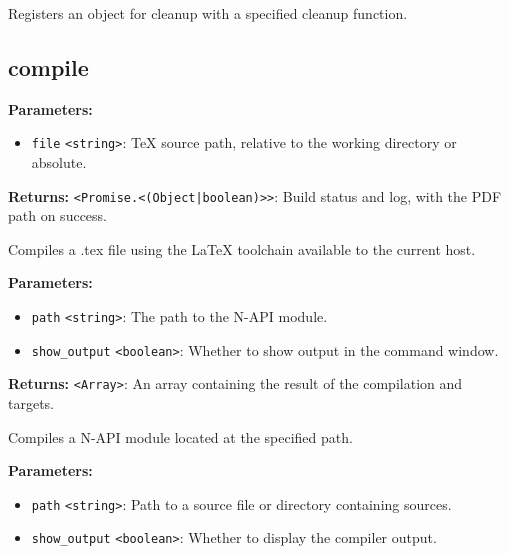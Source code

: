 \documentclass[12pt,a4paper]{article}
\begin{document}
\noindent Registers an object for cleanup with a specified cleanup function.


\subsection{compile}
\vspace{5mm}
\noindent {}


\noindent \textbf{Parameters:}
\begin{itemize}
  \item \texttt{file} \texttt{<string>}: TeX source path, relative to the working directory or absolute.
\end{itemize}

\noindent \textbf{Returns:} \texttt{<Promise.<(Object|boolean)>>}: Build status and log, with the PDF path on success.

\noindent Compiles a .tex file using the LaTeX toolchain available to the current host.

\vspace{5mm}
\noindent {}


\noindent \textbf{Parameters:}
\begin{itemize}
  \item \texttt{path} \texttt{<string>}: The path to the N-API module.
  \item \texttt{show\_output} \texttt{<boolean>}: Whether to show output in the command window.
\end{itemize}

\noindent \textbf{Returns:} \texttt{<Array>}: An array containing the result of the compilation and targets.

\noindent Compiles a N-API module located at the specified path.

\vspace{5mm}
\noindent {}


\noindent \textbf{Parameters:}
\begin{itemize}
  \item \texttt{path} \texttt{<string>}: Path to a source file or directory containing sources.
  \item \texttt{show\_output} \texttt{<boolean>}: Whether to display the compiler output.
\end{itemize}
\end{document}

